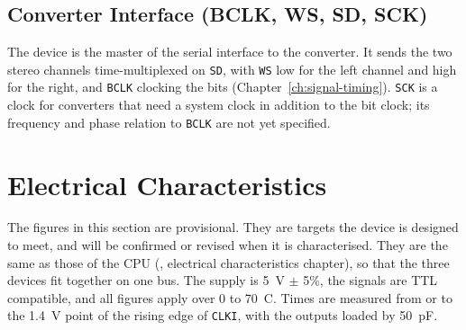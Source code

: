 \subsection{Converter Interface (BCLK, WS, SD, SCK)}
\label{sec:converter-interface}

The device is the master of the serial interface to the converter. It sends the two stereo channels time-multiplexed on
\texttt{SD}, with \texttt{WS} low for the left channel and high for the right, and \texttt{BCLK} clocking the bits
(Chapter~\ref{ch:signal-timing}). \texttt{SCK} is a clock for converters that need a system clock in addition to the
bit clock; its frequency and phase relation to \texttt{BCLK} are not yet specified.

\section{Electrical Characteristics}
\label{sec:electrical}

The figures in this section are provisional. They are targets the device is designed to meet, and will be confirmed or
revised when it is characterised. They are the same as those of the CPU (\hwmanual{}, electrical characteristics
chapter), so that the three devices fit together on one bus. The supply is 5~V $\pm$ 5\%, the signals are TTL
compatible, and all figures apply over 0 to 70~\textdegree{}C. Times are measured from or to the 1.4~V point of the
rising edge of \texttt{CLKI}, with the outputs loaded by 50~pF.

